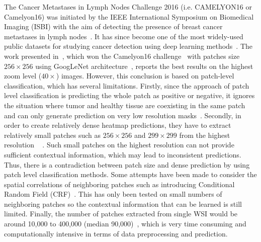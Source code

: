 The Cancer Metastases in Lymph Nodes Challenge 2016 (i.e. CAMELYON16 or Camelyon16) was initiated by the IEEE International Symposium on Biomedical Imaging (ISBI) with the aim of detecting the presence of breast cancer metastases in lymph nodes~\cite{Bejnordi2017}. It has since become one of the most widely-used public datasets for studying cancer detection using deep learning methods~\cite{Wang2016,Liu2017,zhang2023whole,shen2022identify,yu2023bayesian,tourniaire2023ms,khaliliboroujeni2022end,jin2020integrative,liu2020effidiag,Guo2019}. The work presented in~\cite{Wang2016}, which won the Camelyon16 challenge~\cite{Bejnordi2017} with patches size $256\times256$ using GoogLeNet architecture~\cite{Szegedy2015}, reports the best results on the highest zoom level ($40\times$) images. However, this conclusion is based on patch-level classification, which has several limitations. Firstly, since the approach of patch level classification is predicting the whole patch as positive or negative, it ignores the situation where tumor and healthy tissue are coexisting in the same patch and can only generate prediction on very low resolution masks~\cite{Liu2017}. Secondly, in order to create relatively dense heatmap predictions, they have to extract relatively small patches such as $256\times256$ and $299\times299$ from the highest resolution ~\cite{Liu2017,Wang2016} . Such small patches on the highest resolution can not provide sufficient contextual information, which may lead to inconsistent predictions. Thus, there is a contradiction between patch size and dense prediction by using patch level classification methods. Some attempts have been made to consider the spatial correlations of neighboring patches such as introducing Conditional Random Field (CRF)~\cite{Li2018}. This has only been tested on small numbers of neighboring patches so the contextual information that can be learned is still limited. Finally, the number of patches extracted from single WSI would be around 10,000 to 400,000 (median 90,000)~\cite{Liu2017}, which is very time consuming and computationally intensive in terms of data preprocessing and prediction. 


